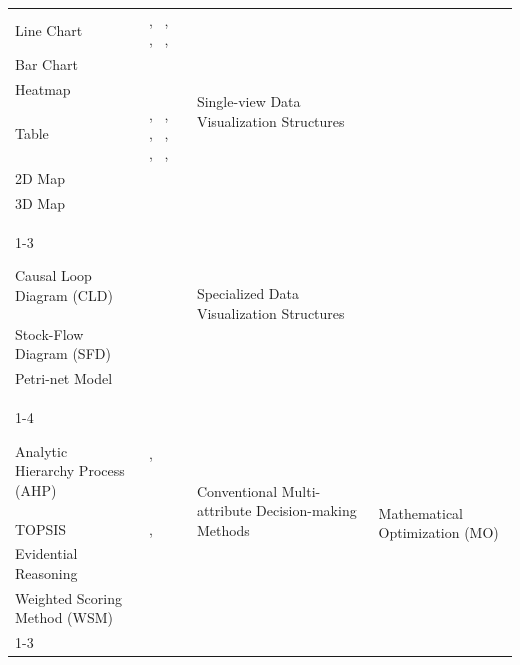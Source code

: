 \documentclass{sfuthesis}
\begin{document}
\begin{appendices}
\begin{landscape}
\begin{longtable}{
p{5.5cm}
p{4cm}
p{6cm}
p{3.5cm}
}
Line Chart &
~\cite{Yang2010MacroeconomicDSS}, ~\cite{Sonehara2019CyberPhysicalSociety}, ~\cite{Milic2024DataCenterEnergy}, ~\cite{RiosZertuche2020ElectronicDecisionSupport}, ~\cite{doderer2010sidekick} &
\multirow{6}{6cm}{Single-view Data Visualization Structures}
&
\\

Bar Chart &
~\cite{RiosZertuche2020ElectronicDecisionSupport} &
&
\\

Heatmap &
~\cite{muller2021risk} &
&
\\

Table &
~\cite{Yang2010MacroeconomicDSS}, ~\cite{RiosZertuche2020ElectronicDecisionSupport}, ~\cite{valdes2017clinical}, ~\cite{muller2021risk}, ~\cite{Tarnowska2022TinnitusTherapy}, ~\cite{Han2020WastewaterDecisionMaking}, ~\cite{ataei2024intelligent} &
&
\\

2D Map &
~\cite{Sonehara2019CyberPhysicalSociety} &
&
\\

3D Map &
~\cite{Ma2020EquipmentMaintenance} &
&
\\
\cline{1-3}

Causal Loop Diagram (CLD) &
~\cite{Hu2023MegaInfrastructure} &
\multirow{3}{6cm}{Specialized Data Visualization Structures}
&
\\

Stock-Flow Diagram (SFD) &
~\cite{Hu2023MegaInfrastructure} &
&
\\

Petri-net Model &
~\cite{ataei2024intelligent} &
&
\\
\cline{1-4}

Analytic Hierarchy Process (AHP) &
~\cite{Zhu2018EducationalDSS}, ~\cite{DelaCal2026CulturalTourism} &
\multirow{4}{6cm}{Conventional Multi-attribute Decision-making Methods}
&
\multirow{11}{3.5cm}{Mathematical Optimization (MO)}
\\

TOPSIS &
~\cite{Li2023UnbalancedBidding}, ~\cite{gaftandzhieva2023data} &
&
\\

Evidential Reasoning &
~\cite{fu2020data} &
&
\\

Weighted Scoring Method (WSM) &
~\cite{Yu2020FactorySimulation} &
&
\\
\cline{1-3}


\end{longtable}
\end{landscape}
\end{appendices}
\end{document}
